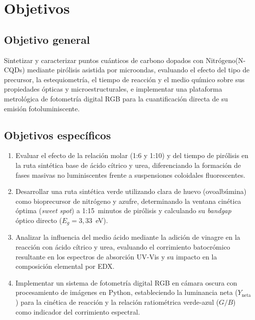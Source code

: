 \section{Objetivos}
\subsection{Objetivo general}
Sintetizar y caracterizar puntos cuánticos de carbono dopados con Nitrógeno(N-CQDs) mediante pirólisis asistida por microondas, evaluando el efecto del tipo de precursor, la estequiometría, el tiempo de reacción y el medio químico sobre sus propiedades ópticas y microestructurales, e implementar una plataforma metrológica de fotometría digital RGB para la cuantificación directa de su emisión fotoluminiscente.

\subsection{Objetivos específicos}
\begin{enumerate}
    \item Evaluar el efecto de la relación molar (1:6 y 1:10) y del tiempo de pirólisis en la ruta sintética base de ácido cítrico y urea, diferenciando la formación de fases masivas no luminiscentes frente a suspensiones coloidales fluorescentes.
    
    \item Desarrollar una ruta sintética verde utilizando clara de huevo (ovoalbúmina) como bioprecursor de nitrógeno y azufre, determinando la ventana cinética óptima (\textit{sweet spot}) a 1:15~minutos de pirólisis y calculando su \textit{bandgap} óptico directo ($E_g = 3{,}33$~eV).
    
    \item Analizar la influencia del medio ácido mediante la adición de vinagre en la reacción con ácido cítrico y urea, evaluando el corrimiento batocrómico resultante en los espectros de absorción UV-Vis y su impacto en la composición elemental por EDX.
    
    \item Implementar un sistema de fotometría digital RGB en cámara oscura con procesamiento de imágenes en Python, estableciendo la luminancia neta ($Y_{\text{neta}}$) para la cinética de reacción y la relación ratiométrica verde-azul ($G/B$) como indicador del corrimiento espectral.
\end{enumerate}